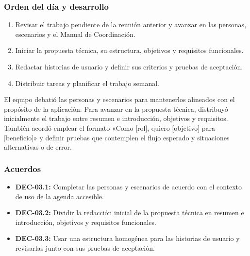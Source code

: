 \subsubsection{Orden del día y desarrollo}
\begin{enumerate}[leftmargin=*]
  \item Revisar el trabajo pendiente de la reunión anterior y avanzar en las personas, escenarios y el Manual de Coordinación.
  \item Iniciar la propuesta técnica, su estructura, objetivos y requisitos funcionales.
  \item Redactar historias de usuario y definir sus criterios y pruebas de aceptación.
  \item Distribuir tareas y planificar el trabajo semanal.
\end{enumerate}
El equipo debatió las personas y escenarios para mantenerlos alineados con el propósito de la aplicación. Para avanzar en la propuesta técnica, distribuyó inicialmente el trabajo entre resumen e introducción, objetivos y requisitos. También acordó emplear el formato «Como [rol], quiero [objetivo] para [beneficio]» y definir pruebas que contemplen el flujo esperado y situaciones alternativas o de error.

\subsubsection{Acuerdos}
\begin{itemize}[leftmargin=*]
  \item \textbf{DEC-03.1:} Completar las personas y escenarios de acuerdo con el contexto de uso de la agenda accesible.
  \item \textbf{DEC-03.2:} Dividir la redacción inicial de la propuesta técnica en resumen e introducción, objetivos y requisitos funcionales.
  \item \textbf{DEC-03.3:} Usar una estructura homogénea para las historias de usuario y revisarlas junto con sus pruebas de aceptación.
\end{itemize}

